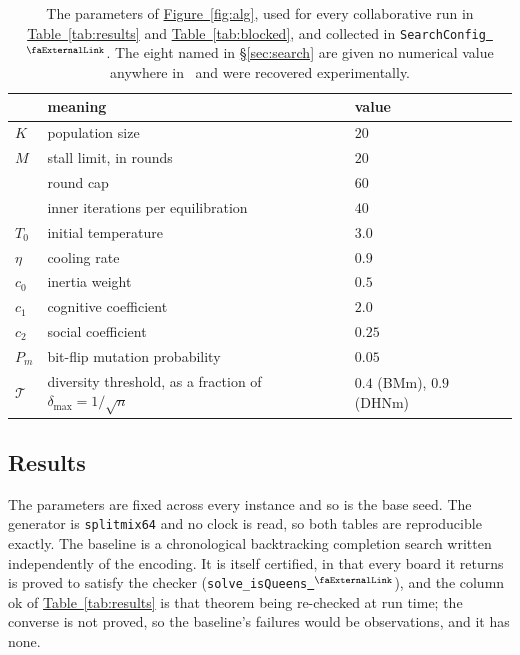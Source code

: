 \documentclass{easychair}
\newcommand{\secref}[1]{\hyperref[#1]{\textcolor{academicpurple}{\S\ref*{#1}}}}
\newcommand{\citeref}[1]{\textcolor{academicpurple}{\cite{#1}}}
\newcommand{\tabref}[1]{\textcolor{academicpurple}{\hyperref[#1]{Table~\ref*{#1}}}}
\newcommand{\figref}[1]{\textcolor{academicpurple}{\hyperref[#1]{Figure~\ref*{#1}}}}
\newcommand{\extlink}{~\ensuremath{{}^\text{\faExternalLink}}}
\newcommand{\repoowner}{mkaratarakis/HNBM}
\newcommand{\reporef}{1bd91612ee31180f6c99fa11090b713f3012ead4}
\newcommand{\repo}{https://github.com/\repoowner/blob/\reporef}
\newcommand{\srcl}[2]{\href{\repo/#1\#L#2}{\extlink}}
\newcommand{\qsrc}[2]{\srcl{HopfieldNet/QUBO/Instances/Queens/#1}{#2}}
\newcommand{\qusrc}[2]{\srcl{HopfieldNet/QUBO/#1}{#2}}
\begin{document}
\begin{table}[H]
\centering\small
\setlength{\tabcolsep}{5pt}
\begin{tabular}{@{}l p{} l@{}}
\toprule
& meaning & value\\
\midrule
$K$            & population size                                     & $20$\\
$M$            & stall limit, in rounds                              & $20$\\
               & round cap                                           & $60$\\
               & inner iterations per equilibration                  & $40$\\
$T_0$          & initial temperature                                 & $3.0$\\
$\eta$         & cooling rate                                        & $0.9$\\
$c_0$          & inertia weight                                      & $0.5$\\
$c_1$          & cognitive coefficient                               & $2.0$\\
$c_2$          & social coefficient                                  & $0.25$\\
$P_m$          & bit-flip mutation probability                       & $0.05$\\
$\mathcal{T}$  & diversity threshold, as a fraction of $\delta_{\max} = 1/\sqrt{n}$
               & $0.4$ (BMm), $0.9$ (DHNm)\\
\bottomrule
\end{tabular}
\caption{The parameters of \figref{fig:alg}, used for every collaborative run in
\tabref{tab:results} and \tabref{tab:blocked}, and collected in
\texttt{SearchConfig}\qusrc{Search.lean}{61}. The eight named in \secref{sec:search} are given no
numerical value anywhere in~\citeref{liwang2022} and were recovered
experimentally.}\label{tab:params}
\end{table}

\subsection*{Results}

The parameters are fixed across every instance and so is the base seed. The generator is
\texttt{splitmix64} and no clock is read, so both tables are reproducible exactly. The baseline is a
chronological backtracking completion search written independently of the encoding. It is itself
certified, in that every board it returns is proved to satisfy the checker
(\lstinline{solve_isQueens}\qsrc{Baseline.lean}{223}), and the column \textsf{ok} of
\tabref{tab:results} is that theorem being re-checked at run time; the converse is
not proved, so the baseline's failures would be observations, and it has none.
\end{document}
